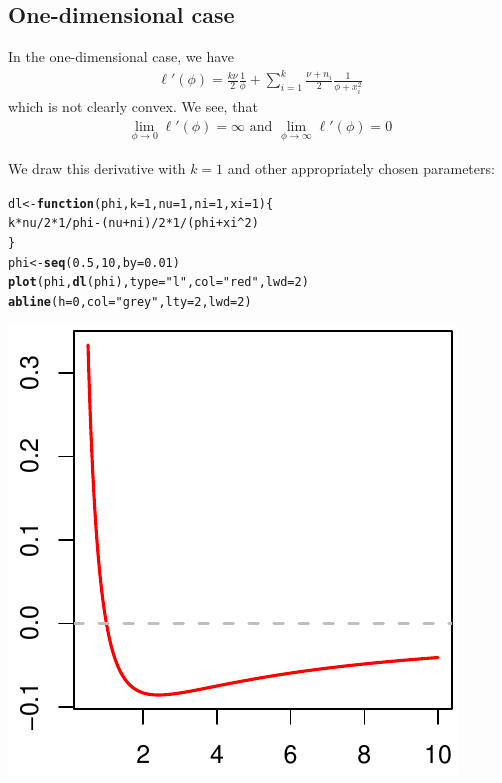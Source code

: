 \documentclass{article}\usepackage[]{graphicx}\usepackage[]{color}
\makeatletter
\def\maxwidth{ %
  \ifdim\Gin@nat@width>\linewidth
    \linewidth
  \else
    \Gin@nat@width
  \fi
}
\newcommand{\hlnum}[1]{\textcolor[rgb]{0.686,0.059,0.569}{#1}}%
\newcommand{\hlstr}[1]{\textcolor[rgb]{0.192,0.494,0.8}{#1}}%
\newcommand{\hlopt}[1]{\textcolor[rgb]{0,0,0}{#1}}%
\newcommand{\hlstd}[1]{\textcolor[rgb]{0.345,0.345,0.345}{#1}}%
\newcommand{\hlkwa}[1]{\textcolor[rgb]{0.161,0.373,0.58}{\textbf{#1}}}%
\newcommand{\hlkwb}[1]{\textcolor[rgb]{0.69,0.353,0.396}{#1}}%
\newcommand{\hlkwc}[1]{\textcolor[rgb]{0.333,0.667,0.333}{#1}}%
\newcommand{\hlkwd}[1]{\textcolor[rgb]{0.737,0.353,0.396}{\textbf{#1}}}%
\newenvironment{kframe}{%
 \def\at@end@of@kframe{}%
 \ifinner\ifhmode%
  \def\at@end@of@kframe{\end{minipage}}%
  \begin{minipage}{\columnwidth}%
 \fi\fi%
 \def\FrameCommand##1{\hskip\@totalleftmargin \hskip-\fboxsep
 \colorbox{shadecolor}{##1}\hskip-\fboxsep
     \hskip-\linewidth \hskip-\@totalleftmargin \hskip\columnwidth}%
 \MakeFramed {\advance\hsize-\width
   \@totalleftmargin\z@ \linewidth\hsize
   \@setminipage}}%
 {\par\unskip\endMakeFramed%
 \at@end@of@kframe}
\newenvironment{knitrout}{}{} %
\makeatother
\begin{document}
\subsection{One-dimensional case}
In the one-dimensional case, we have
\begin{align*}
  \ell'(\phi)
  = \frac{k\nu}{2}\frac{1}{\phi} +
      \sum_{i = 1}^k \frac{\nu + n_i}{2}\frac{1}{\phi + x_i^2}
\end{align*}
which is not clearly convex. We see, that
\begin{align*}
  \lim_{\phi \to 0} \ell'(\phi) = \infty
  \text{  and  }
  \lim_{\phi \to \infty} \ell'(\phi) = 0
\end{align*}

We draw this derivative with $k = 1$ and other appropriately chosen parameters:
\begin{knitrout}\footnotesize
{}\color{fgcolor}\begin{kframe}
\begin{alltt}
\hlstd{dl} \hlkwb{<-} \hlkwa{function}\hlstd{(}\hlkwc{phi}\hlstd{,} \hlkwc{k} \hlstd{=} \hlnum{1}\hlstd{,} \hlkwc{nu} \hlstd{=} \hlnum{1}\hlstd{,} \hlkwc{ni} \hlstd{=} \hlnum{1}\hlstd{,} \hlkwc{xi} \hlstd{=} \hlnum{1}\hlstd{)  \{}
  \hlstd{k}\hlopt{*}\hlstd{nu}\hlopt{/}\hlnum{2}\hlopt{*}\hlnum{1}\hlopt{/}\hlstd{phi} \hlopt{-} \hlstd{(nu} \hlopt{+} \hlstd{ni)}\hlopt{/}\hlnum{2} \hlopt{*} \hlnum{1}\hlopt{/}\hlstd{(phi} \hlopt{+} \hlstd{xi}\hlopt{^}\hlnum{2}\hlstd{)}
\hlstd{\}}
\hlstd{phi} \hlkwb{<-} \hlkwd{seq}\hlstd{(}\hlnum{0.5}\hlstd{,} \hlnum{10}\hlstd{,} \hlkwc{by} \hlstd{=} \hlnum{0.01}\hlstd{)}
\hlkwd{plot}\hlstd{(phi,} \hlkwd{dl}\hlstd{(phi),} \hlkwc{type} \hlstd{=} \hlstr{"l"}\hlstd{,} \hlkwc{col} \hlstd{=} \hlstr{"red"}\hlstd{,} \hlkwc{lwd} \hlstd{=} \hlnum{2}\hlstd{)}
\hlkwd{abline}\hlstd{(}\hlkwc{h} \hlstd{=} \hlnum{0}\hlstd{,} \hlkwc{col} \hlstd{=} \hlstr{"grey"}\hlstd{,} \hlkwc{lty} \hlstd{=} \hlnum{2}\hlstd{,} \hlkwc{lwd} \hlstd{=} \hlnum{2}\hlstd{)}
\end{alltt}
\end{kframe}
\includegraphics[width=\maxwidth]{figure/one_dimensional_loglik} 


\end{knitrout}
\end{document}
